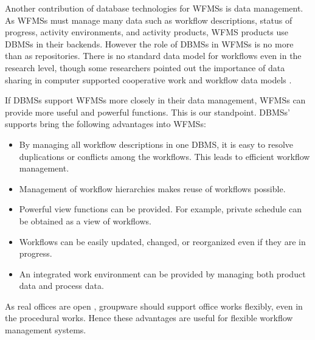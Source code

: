 Another contribution of database technologies for WFMSs is data
management.  As WFMSs must manage many data such as workflow
descriptions, status of progress, activity environments, and activity
products, WFMS products use DBMSs in their backends.  However the role of
DBMSs in WFMSs is no more than as repositories.  There is no standard
data model for workflows even in the research level, though some
researchers pointed out the importance of data sharing in computer
supported cooperative work \cite{greif:toois87} and workflow data models
\cite{alonso:nsf96}.

If DBMSs support WFMSs more closely in their data management, WFMSs can
provide more useful and powerful functions.  This is our
standpoint\cite{kunishima:ipsjdbs95-07, kunishima:codas96,%
yokota:upmail96, yokota:lnai97}.  DBMSs' supports bring the following
advantages into WFMSs:
\begin{itemize}
 \setlength{\itemsep}{0mm}
 \setlength{\parskip}{0mm}
 \item By managing all workflow descriptions in one DBMS, it is easy to
     resolve duplications or conflicts among the workflows.  This leads
     to efficient workflow management.
 \item Management of workflow hierarchies makes reuse of workflows 
     possible.
 \item Powerful view functions can be provided.  For example, private
     schedule can be obtained as a view of workflows.
 \item Workflows can be easily updated, changed, or reorganized even if 
     they are in progress.
 \item An integrated work environment can be provided by managing both
     product data and process data.
\end{itemize}
As real offices are open \cite{hewitt:toois86}, groupware should support
office works flexibly, even in the procedural works.  Hence these advantages
are useful for flexible workflow management systems.

